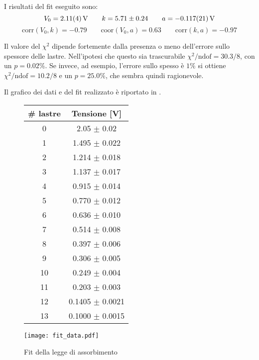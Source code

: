 I risultati del fit eseguito sono:
$$V_0 = \SI{2.11 \pm 0.04}{\volt} \qquad k = 5.71 \pm 0.24 \qquad a = \SI{-0.117 \pm 0.021}{\volt}$$
$$ \text{corr}(V_0,k) = -0.79 \qquad \text{coor}(V_0,a) = 0.63 \qquad \text{corr}(k,a) = -0.97$$

Il valore del $\chi^2$ dipende fortemente dalla presenza o meno dell'errore sullo spessore delle lastre. Nell'ipotesi che questo sia trascurabile $\chi^2 /\text{ndof} = 30.3 / 8$, con un $p = 0.02\%$. Se invece, ad esempio, l'errore sullo spesso è $1\%$ si ottiene $\chi^2 /\text{ndof} = 10.2 / 8$ e un $p = 25.0\%$, che sembra quindi ragionevole.

Il grafico dei dati e del fit realizzato è riportato in .

\begin{figure}[H]
		\begin{minipage}{0.28\textwidth}
			\begin{tabular}{cc}
				\toprule
				\# lastre & Tensione [V]\\
				\midrule
				0  & 2.05 $\pm$ 0.02\\
				1  & 1.495 $\pm$ 0.022\\
				2  & 1.214 $\pm$ 0.018\\
				3  & 1.137 $\pm$ 0.017\\
				4  & 0.915 $\pm$ 0.014\\
				5  & 0.770 $\pm$ 0.012\\
				6  & 0.636 $\pm$ 0.010\\
				7  & 0.514 $\pm$ 0.008\\
				8  & 0.397 $\pm$ 0.006\\
				9  & 0.306 $\pm$ 0.005\\
				10 & 0.249 $\pm$ 0.004\\
				11 & 0.203 $\pm$ 0.003\\
				12 & 0.1405 $\pm$ 0.0021\\
				13 & 0.1000 $\pm$ 0.0015\\
				\bottomrule
			\end{tabular}
			\label{tab:data}
		\end{minipage}
	\begin{minipage}{0.75\textwidth}
		\centering
		\texttt{[image: fit\_data.pdf]}
		\caption{Fit della legge di assorbimento}
		\label{fig:fit}
	\end{minipage}
\end{figure}
